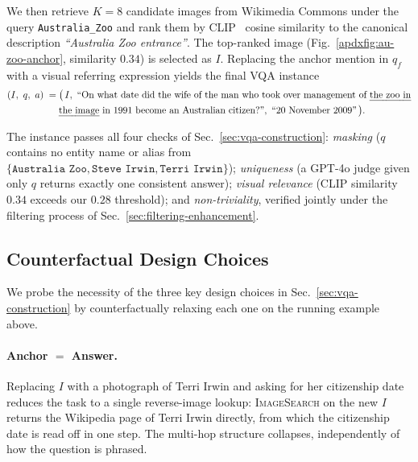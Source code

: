 We then retrieve $K=8$ candidate images from Wikimedia Commons under the query \texttt{Australia\_Zoo} and rank them by CLIP~\citep{radford2021learning} cosine similarity to the canonical description \emph{``Australia Zoo entrance''}. The top-ranked image (Fig.~\ref{apdxfig:au-zoo-anchor}, similarity $0.34$) is selected as $I$. Replacing the anchor mention in $q_f$ with a visual referring expression yields the final VQA instance
\begin{equation*}
\begin{aligned}
(I,\ q,\ a) \;=\;& \bigl(\,I,\ \text{``On what date did the wife of the man who took over management of \emph{the zoo in}}\\
                 & \text{\emph{the image} in 1991 become an Australian citizen?''},\ \text{``20 November 2009''}\,\bigr).
\end{aligned}
\end{equation*}


The instance passes all four checks of Sec.~\ref{sec:vqa-construction}: \emph{masking} ($q$ contains no entity name or alias from $\{\texttt{Australia Zoo}, \texttt{Steve Irwin}, \texttt{Terri Irwin}\}$); \emph{uniqueness} (a GPT-4o judge given only $q$ returns exactly one consistent answer); \emph{visual relevance} (CLIP similarity $0.34$ exceeds our $0.28$ threshold); and \emph{non-triviality}, verified jointly under the filtering process of Sec.~\ref{sec:filtering-enhancement}.



\subsection{Counterfactual Design Choices}
\label{apdx:vqa-counterfactuals}

We probe the necessity of the three key design choices in Sec.~\ref{sec:vqa-construction} by counterfactually relaxing each one on the running example above.

\paragraph{Anchor $=$ Answer.}
Replacing $I$ with a photograph of Terri Irwin and asking for her citizenship date reduces the task to a single reverse-image lookup: \textsc{ImageSearch} on the new $I$ returns the Wikipedia page of Terri Irwin directly, from which the citizenship date is read off in one step. The multi-hop structure collapses, independently of how the question is phrased.

